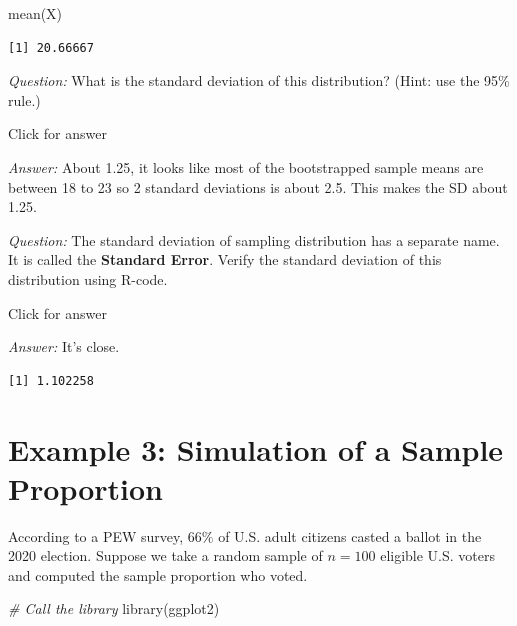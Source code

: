 \documentclass[
]{book}
\newenvironment{Shaded}{\begin{snugshade}}{\end{snugshade}}
\newcommand{\CommentTok}[1]{\textcolor[rgb]{0.56,0.35,0.01}{\textit{#1}}}
\newcommand{\FunctionTok}[1]{\textcolor[rgb]{0.00,0.00,0.00}{#1}}
\newcommand{\NormalTok}[1]{#1}
\newcommand{\SpecialCharTok}[1]{\textcolor[rgb]{0.00,0.00,0.00}{#1}}
\begin{document}
\begin{Shaded}
\begin{Highlighting}[]
\FunctionTok{mean}\NormalTok{(X)}
\end{Highlighting}
\end{Shaded}

\begin{verbatim}
[1] 20.66667
\end{verbatim}

\emph{Question:} What is the standard deviation of this distribution? (Hint: use the 95\% rule.)

Click for answer

\emph{Answer:} About 1.25, it looks like most of the bootstrapped sample means are between 18 to 23 so 2 standard deviations is about 2.5. This makes the SD about 1.25.

\emph{Question:} The standard deviation of sampling distribution has a separate name. It is called the \textbf{Standard Error}. Verify the standard deviation of this distribution using R-code.

Click for answer

\emph{Answer:} It's close.

\begin{Shaded}
\end{Shaded}

\begin{verbatim}
[1] 1.102258
\end{verbatim}

\hypertarget{example-3-simulation-of-a-sample-proportion}{%
\section{Example 3: Simulation of a Sample Proportion}\label{example-3-simulation-of-a-sample-proportion}}

According to a PEW survey, \(66\%\) of U.S. adult citizens casted a ballot in the 2020 election. Suppose we take a random sample of \(n=100\) eligible U.S. voters and computed the sample proportion who voted.

\begin{Shaded}
\begin{Highlighting}[]
\CommentTok{\# Call the library}
\FunctionTok{library}\NormalTok{(ggplot2)}
\end{Highlighting}
\end{Shaded}
\end{document}
